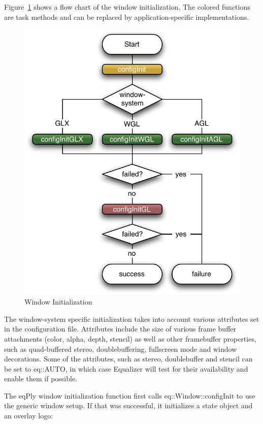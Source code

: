 \documentclass[10pt,a4]{scrartcl}
\newcommand{\fig}[1]{Figure~\ref{#1}}
\begin{document}
\fig{fWindowInit} shows a flow chart of the window initialization. The
colored functions are task methods and can be replaced by
application-specific implementations.

\begin{figure}
  \includegraphics[width=.382\textwidth]{images/windowInit.pdf}
  {\caption{\small\label{fWindowInit}Window Initialization}}
\vspace{-4ex}\end{figure}
The window-system specific initialization takes into account various
attributes set in the configuration file. Attributes include the size of
various frame buffer attachments (color, alpha, depth, stencil) as well
as other framebuffer properties, such as quad-buffered stereo,
doublebuffering, fullscreen mode and window decorations. Some of the
attributes, such as stereo, doublebuffer and stencil can be set to
\textsf{eq::AUTO}, in which case Equalizer will test for their availability and 
enable them if possible.

The \textsf{eqPly} window initialization function first calls
\textsf{eq::Window::configInit} to use the generic window setup. If that
was successful, it initializes a state object and an overlay logo:
\vspace{4ex}
\end{document}
